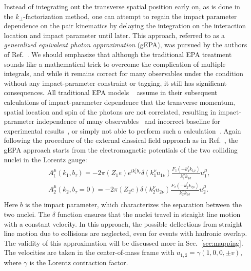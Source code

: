 \documentclass[twocolumn,epjc3]{svjour3}\sloppy
\begin{document}
\label{sec:theory}
Instead of integrating out the transverse spatial position early on, as is done in the $k_\perp$-factorization method, one can attempt to regain the impact parameter dependence on the pair kinematics by delaying the integration on the interaction location and impact parameter until later. This approach, referred to as a \textit{generalized equivalent photon approximation} (gEPA), was pursued by the authors of Ref.~\cite{zhaInitialTransversemomentumBroadening2020b}. We should emphasize that although the traditional EPA treatment sounds like a mathematical trick to overcome the complication of multiple integrals, and while it remains correct for many observables under the condition without any impact-parameter constraint or tagging, it still has significant consequences. All traditional EPA models ~\cite{kleinSTARlightMonteCarlo2017b,SuperChic3,Zha:2018tlq} assume in their subsequent calculations of impact-parameter dependence that the transverse momentum, spatial location and spin of the photons are not correlated, resulting in impact-parameter independence of many observables~\cite{kleinSTARlightMonteCarlo2017b} and incorrect baseline for experimental results~\cite{starcollaborationLowEnsuremathPair2018b,atlascollaborationObservationCentralityDependentAcoplanarity2018a}, or simply not able to perform such a calculation~\cite{SuperChic3}. 
Again following the procedure of the external classical field approach as in Ref.~\cite{PhysRevC.47.2308}, the gEPA approach starts from the electromagnetic potentials of the two colliding nuclei in the Lorentz gauge:
\begin{equation}
    \label{eq:external}
    \begin{split}
        &A_{1}^{\mu}(k_{1},b_{\tau})= -2 \pi (Z_{1} e) e^{ik_{1}^{\tau}b_{\tau}} \delta(k_{1}^{\nu}u_{1\nu}) \frac{F_{1}(-k_{1}^{\rho}k_{1\rho})}{k_{1}^{\sigma}k_{1\sigma}} u_{1}^{\mu},\\
        &A_{2}^{\mu}(k_{2},b_{\tau}=0)= -2 \pi (Z_{2} e) \delta(k_{2}^{\nu}u_{2\nu}) \frac{F_{2}(-k_{2}^{\rho}k_{2\rho})}{k_{2}^{\sigma}k_{2\sigma}} u_{2}^{\mu}.\\
    \end{split}
\end{equation}
Here $b$ is the impact parameter, which characterizes the separation between the two nuclei. The $\delta$ function ensures that the nuclei travel in straight line motion with a constant velocity. In this approach, the possible deflections from straight line motion due to collisions are neglected, even for events with hadronic overlap. The validity of this approximation will be discussed more in Sec.~\ref{sec:mapping}. The velocities are taken in the center-of-mass frame with $u_{1,2} = \gamma(1,0,0,\pm v)$, where $\gamma$ is the Lorentz contraction factor.
\end{document}
